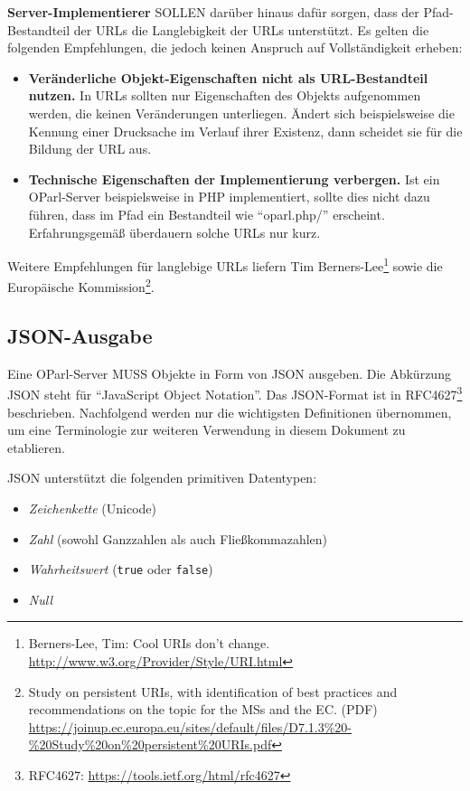 \documentclass[,a4paper]{article}
\begin{document}
\textbf{Server-Implementierer} SOLLEN darüber hinaus dafür sorgen, dass
der Pfad-Bestandteil der URLs die Langlebigkeit der URLs unterstützt. Es
gelten die folgenden Empfehlungen, die jedoch keinen Anspruch auf
Vollständigkeit erheben:

\begin{itemize}
\item
  \textbf{Veränderliche Objekt-Eigenschaften nicht als URL-Bestandteil
  nutzen.} In URLs sollten nur Eigenschaften des Objekts aufgenommen
  werden, die keinen Veränderungen unterliegen. Ändert sich
  beispielsweise die Kennung einer Drucksache im Verlauf ihrer Existenz,
  dann scheidet sie für die Bildung der URL aus.
\item
  \textbf{Technische Eigenschaften der Implementierung verbergen.} Ist
  ein OParl-Server beispielsweise in PHP implementiert, sollte dies
  nicht dazu führen, dass im Pfad ein Bestandteil wie ``oparl.php/''
  erscheint. Erfahrungsgemäß überdauern solche URLs nur kurz.
\end{itemize}

Weitere Empfehlungen für langlebige URLs liefern Tim
Berners-Lee\footnote{Berners-Lee, Tim: Cool URIs don't change.
  \url{http://www.w3.org/Provider/Style/URI.html}} sowie die Europäische
Kommission\footnote{Study on persistent URIs, with identification of
  best practices and recommendations on the topic for the MSs and the
  EC. (PDF)
  \url{https://joinup.ec.europa.eu/sites/default/files/D7.1.3\%20-\%20Study\%20on\%20persistent\%20URIs.pdf}}.

\subsection{JSON-Ausgabe}\label{json-ausgabe}

Eine OParl-Server MUSS Objekte in Form von JSON ausgeben. Die Abkürzung
JSON steht für ``JavaScript Object Notation''. Das JSON-Format ist in
RFC4627\footnote{RFC4627: \url{https://tools.ietf.org/html/rfc4627}}
beschrieben. Nachfolgend werden nur die wichtigsten Definitionen
übernommen, um eine Terminologie zur weiteren Verwendung in diesem
Dokument zu etablieren.

JSON unterstützt die folgenden primitiven Datentypen:

\begin{itemize}
\itemsep1pt\parskip0pt
\item
  \emph{Zeichenkette} (Unicode)
\item
  \emph{Zahl} (sowohl Ganzzahlen als auch Fließkommazahlen)
\item
  \emph{Wahrheitswert} (\texttt{true} oder \texttt{false})
\item
  \emph{Null}
\end{itemize}
\end{document}
